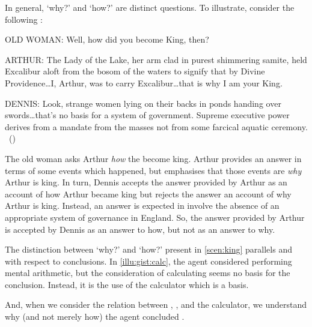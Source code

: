 \begin{note}
  In general, `why?' and `how?' are distinct questions.
  To illustrate, consider the following \scen{}:

  \begin{scenario}[England AD 932]
    \label{scen:king}
    \vspace{-\baselineskip}
    \begin{screenplay}
    \item[OLD WOMAN:]
      Well, how did you become King, then?
    \item[ARTHUR:]
      The Lady of the Lake, her arm clad in purest shimmering samite, held Excalibur aloft from the bosom of the waters to signify that by Divine Providence\space\dots\space I, Arthur, was to carry Excalibur\dots\space that is why I am your King.
    \item[DENNIS:]
      Look, strange women lying on their backs in ponds handing over swords\space\dots\space that's no basis for a system of government.
      Supreme executive power derives from a mandate from the masses not from some farcical aquatic ceremony.\newline
      \mbox{ }\hfill\mbox{(\cite[8--9]{Cleese:1974aa})}
    \end{screenplay}
    \vspace{-\baselineskip}
  \end{scenario}

  The old woman asks Arthur \emph{how} the become king.
  Arthur provides an answer in terms of some events which happened, but emphasises that those events are \emph{why} Arthur is king.
  In turn, Dennis accepts the answer provided by Arthur as an account of how Arthur became king but rejects the answer an account of why Arthur is king.
  Instead, an answer is expected in involve the absence of an appropriate system of governance in England.
  So, the answer provided by Arthur is accepted by Dennis as an answer to how, but not as an answer to why.

  The distinction between `why?' and `how?' present in \autoref{scen:king} parallels \qWhy{} and \qHow{} with respect to conclusions.
  In \autoref{illu:gist:calc}, the agent considered performing mental arithmetic, but the consideration of calculating \gistCalcEq{} seems no basis for the conclusion.
  Instead, it is the use of the calculator which is a basis.

  And, when we consider the relation between \propM{\gistCalcEq{}}, , and the calculator, we understand why (and not merely how) the agent concluded \gistCalcEq{}.
\end{note}

